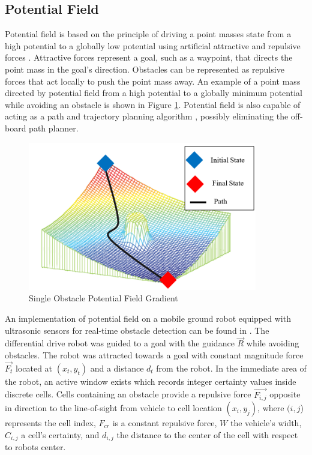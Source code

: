 \documentclass[numbered,pdftex]{ohio-etd}
\begin{document}
\subsection{Potential Field}

Potential field is based on the principle of driving a point masses state from a high potential to a globally low potential using artificial attractive and repulsive forces \cite{khatib_real-time_1986}. Attractive forces represent a goal, such as a waypoint, that directs the point mass in the goal's direction. Obstacles can be represented as repulsive forces that act locally to push the point mass away. An example of a point mass directed by potential field from a high potential to a globally minimum potential while avoiding an obstacle is shown in Figure \ref{fig:pfobstacle}. Potential field is also capable of acting as a path and trajectory planning algorithm \cite{rimon_exact_1992}, possibly eliminating the off-board path planner. 

\begin{figure}[H]
	\centering
	\includegraphics[width=10cm]{PaperFigures/pfObstacle}
	\caption{Single Obstacle Potential Field Gradient \cite{liu_virtual-waypoint_2016}}
	\label{fig:pfobstacle}
\end{figure}


An implementation of potential field on a mobile ground robot equipped with ultrasonic sensors for real-time obstacle detection can be found in \cite{borenstein_real-time_1990,borenstein_vector_1991,koren_potential_1991}. The differential drive robot was guided to a goal with the guidance $\overrightarrow{R}$ while avoiding obstacles. The robot was attracted towards a goal with constant magnitude force $\overrightarrow{F_t}$ located at $(x_t,y_t)$ and a distance $d_t$ from the robot. In the immediate area of the robot, an active window exists which records integer certainty values inside discrete cells. Cells containing an obstacle provide a repulsive force $\overrightarrow{F_{i,j}}$ opposite in direction to the line-of-sight from vehicle to cell location $(x_i,y_j)$, where $(i,j$) represents the cell index, $F_{cr}$ is a constant repulsive force, $W$ the vehicle's width, $C_{i,j}$ a cell's certainty, and $d_{i,j}$ the distance to the center of the cell with respect to robots center.
\end{document}
